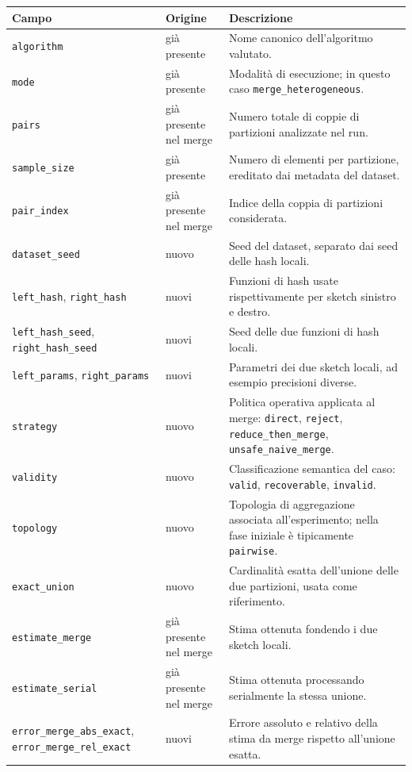 \begin{table}[h]
\centering
\small
\begin{tabular}{p{} p{} p{}}
\toprule
\textbf{Campo} & \textbf{Origine} & \textbf{Descrizione} \\
\midrule
\texttt{algorithm} & già presente & Nome canonico dell'algoritmo valutato. \\
\texttt{mode} & già presente & Modalità di esecuzione; in questo caso \texttt{merge\_heterogeneous}. \\
\texttt{pairs} & già presente nel merge & Numero totale di coppie di partizioni analizzate nel run. \\
\texttt{sample\_size} & già presente & Numero di elementi per partizione, ereditato dai metadata del dataset. \\
\texttt{pair\_index} & già presente nel merge & Indice della coppia di partizioni considerata. \\
\texttt{dataset\_seed} & nuovo & Seed del dataset, separato dai seed delle hash locali. \\
\texttt{left\_hash}, \texttt{right\_hash} & nuovi & Funzioni di hash usate rispettivamente per sketch sinistro e destro. \\
\texttt{left\_hash\_seed}, \texttt{right\_hash\_seed} & nuovi & Seed delle due funzioni di hash locali. \\
\texttt{left\_params}, \texttt{right\_params} & nuovi & Parametri dei due sketch locali, ad esempio precisioni diverse. \\
\texttt{strategy} & nuovo & Politica operativa applicata al merge: \texttt{direct}, \texttt{reject}, \texttt{reduce\_then\_merge}, \texttt{unsafe\_naive\_merge}. \\
\texttt{validity} & nuovo & Classificazione semantica del caso: \texttt{valid}, \texttt{recoverable}, \texttt{invalid}. \\
\texttt{topology} & nuovo & Topologia di aggregazione associata all'esperimento; nella fase iniziale è tipicamente \texttt{pairwise}. \\
\texttt{exact\_union} & nuovo & Cardinalità esatta dell'unione delle due partizioni, usata come riferimento. \\
\texttt{estimate\_merge} & già presente nel merge & Stima ottenuta fondendo i due sketch locali. \\
\texttt{estimate\_serial} & già presente nel merge & Stima ottenuta processando serialmente la stessa unione. \\
\texttt{error\_merge\_abs\_exact}, \texttt{error\_merge\_rel\_exact} & nuovi & Errore assoluto e relativo della stima da merge rispetto all'unione esatta. \\

\end{tabular}
\end{table}
